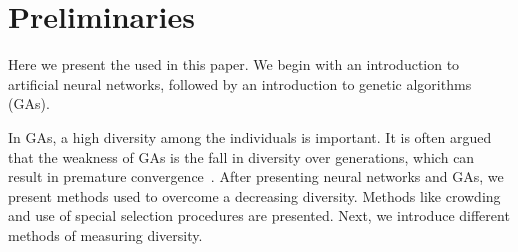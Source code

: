 \section{Preliminaries}
\label{sec:preliminaries}

Here we present the used in this paper.
We begin with an introduction to artificial neural networks, followed by an introduction to genetic algorithms (GAs). 

In GAs, a high diversity among the individuals is important. It is often argued that the weakness of GAs is the fall in diversity over generations, which can result in premature convergence~\cite{diaz2007empirical, 1266373,Zitzler00comparisonof}. After presenting neural networks and GAs,  we present methods used to overcome a decreasing diversity. Methods like crowding and use of special selection procedures are presented. Next, we introduce different methods of measuring diversity.







